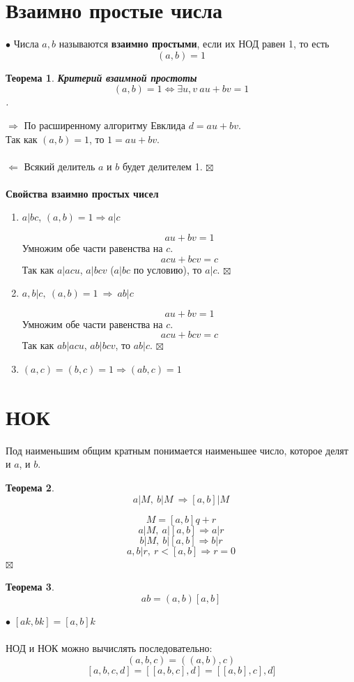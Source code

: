 \documentclass[a4paper, 12pt]{article}
\newtheorem*{theorem}{Теорема}
\newenvironment{Proof}
{\par\noindent{$\blacklozenge$}}
{\hfill$\scriptstyle\boxtimes$}
\begin{document}
    \section{Взаимно простые числа}
    $\bullet$ Числа $a, b$ называются \textbf{взаимно простыми}, если их НОД равен 1, то есть
    $$(a,b)=1$$
    \begin{theorem}
        \textbf{Критерий взаимной простоты}
        $$(a,b)=1 \Leftrightarrow \exists u, v \ au+bv=1$$.
    \end{theorem}
    \begin{Proof}
    $\Rightarrow$ По расширенному алгоритму Евклида $d=au+bv$.\\
    Так как $(a,b)=1$, то $1=au+bv$.\\\\
    $\Leftarrow$ Всякий делитель $a$ и $b$ будет делителем 1.
    \end{Proof}\\\\
    \textbf{Свойства взаимно простых чисел}
    \begin{enumerate}
        \item $a|bc$, $(a,b)=1 \Rightarrow a|c$ 
        \begin{Proof}
        $$au+bv=1$$
        Умножим обе части равенства на $c$.
        $$acu+bcv=c$$
        Так как $a|acu$, $a|bcv$ ($a|bc$ по условию), то $a|c$.
        \end{Proof}
        \item $a,b|c, \ (a,b)=1 \ \Rightarrow \ ab|c$
        \begin{Proof}
        $$au+bv=1$$
        Умножим обе части равенства на $c$.
        $$acu+bcv=c$$
        Так как $ab|acu$, $ab|bcv$, то $ab|c$.
        \end{Proof}
        \item $(a,c)=(b,c)=1 \Rightarrow (ab,c)=1$
    \end{enumerate}
    \section{НОК}
    Под наименьшим общим кратным понимается наименьшее число, которое делят и $a$, и $b$.
    \begin{theorem}
        $$a|M, \ b|M \ \Rightarrow [a,b]|M$$
    \end{theorem}
    \begin{Proof}
    $$M=[a,b]q+r$$
    $$a|M, \ a|[a,b] \Rightarrow a|r$$
    $$b|M, \ b|[a,b] \Rightarrow b|r$$
    $$a,b|r, \ r<[a,b] \Rightarrow r=0$$
    \end{Proof}
    \begin{theorem}
        $$ab=(a,b)[a,b]$$
    \end{theorem}
    $\bullet$ $[ak, bk] = [a,b]k$\\\\
    НОД и НОК можно вычислять последовательно:
    $$(a,b,c)=((a,b),c)$$
    $$[a,b,c,d]=[[a,b,c],d]=[[a,b],c],d]$$
\end{document}
